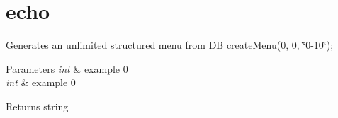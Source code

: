 \hypertarget{echo-example}{\section{echo}
}
Generates an unlimited structured menu from D\-B create\-Menu(0, 0, \char`\"{}0-\/10\char`\"{});


\begin{DoxyParams}{Parameters}
{\em int} & example 0 \\
\hline
{\em int} & example 0\\
\hline
\end{DoxyParams}
\begin{DoxyReturn}{Returns}
string
\end{DoxyReturn}

\begin{DoxyCodeInclude}
\end{DoxyCodeInclude}
 